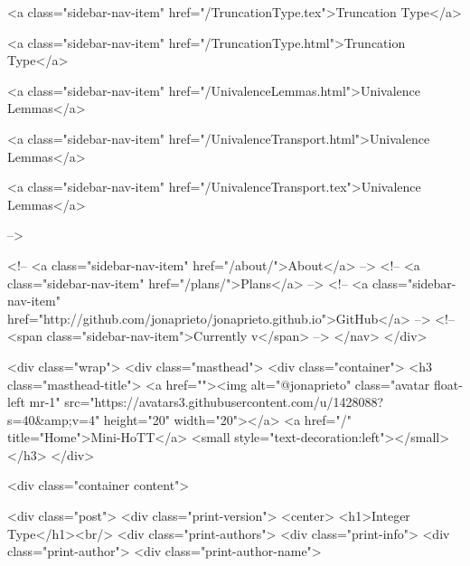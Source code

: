       
    
      
        
          <a class="sidebar-nav-item" href="/TruncationType.tex">Truncation Type</a>
        
      
    
      
        
          <a class="sidebar-nav-item" href="/TruncationType.html">Truncation Type</a>
        
      
    
      
        
          <a class="sidebar-nav-item" href="/UnivalenceLemmas.html">Univalence Lemmas</a>
        
      
    
      
        
          <a class="sidebar-nav-item" href="/UnivalenceTransport.html">Univalence Lemmas</a>
        
      
    
      
        
          <a class="sidebar-nav-item" href="/UnivalenceTransport.tex">Univalence Lemmas</a>
        
      
     -->

    <!-- <a class="sidebar-nav-item" href="/about/">About</a> -->
    <!-- <a class="sidebar-nav-item" href="/plans/">Plans</a> -->
    <!-- <a class="sidebar-nav-item" href="http://github.com/jonaprieto/jonaprieto.github.io">GitHub</a> -->
    <!-- <span class="sidebar-nav-item">Currently v</span> -->
  </nav>
</div>

    <div class="wrap">
      <div class="masthead">
        <div class="container">
          <h3 class="masthead-title">
            <a href=""><img alt="@jonaprieto" class="avatar float-left mr-1" src="https://avatars3.githubusercontent.com/u/1428088?s=40&amp;v=4" height="20" width="20"></a>
            <a href="/" title="Home">Mini-HoTT</a>
            <small style="text-decoration:left"></small>
          </h3>
        </div>
      
      <div class="container content">
        







<div class="post">
  <div class="print-version">
    <center>
      <h1>Integer Type</h1><br/>
        <div class="print-authors">
          <div class="print-info">
            <div class="print-author">
              <div class="print-author-name">
                
